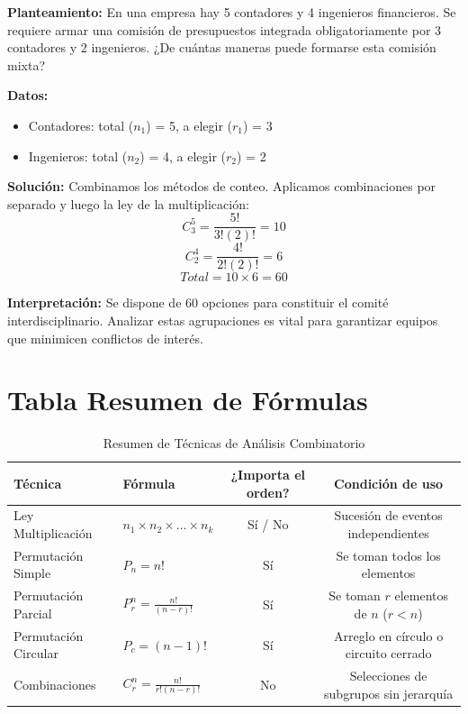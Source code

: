 \documentclass[12pt,letterpaper]{book}
\newcounter{ejemplo}[chapter]
\begin{document}
\begin{ejemplo}
    \textbf{Planteamiento:} En una empresa hay 5 contadores y 4 ingenieros financieros. Se requiere armar una comisión de presupuestos integrada obligatoriamente por 3 contadores y 2 ingenieros. ¿De cuántas maneras puede formarse esta comisión mixta?
    
    \textbf{Datos:}
    \begin{itemize}
        \item Contadores: total ($n_1$) = 5, a elegir ($r_1$) = 3
        \item Ingenieros: total ($n_2$) = 4, a elegir ($r_2$) = 2
    \end{itemize}
    
    \textbf{Solución:}
    Combinamos los métodos de conteo. Aplicamos combinaciones por separado y luego la ley de la multiplicación:
    \[ C_{3}^{5} = \frac{5!}{3!(2)!} = 10 \]
    \[ C_{2}^{4} = \frac{4!}{2!(2)!} = 6 \]
    \[ Total = 10 \times 6 = 60 \]
    
    \textbf{Interpretación:} Se dispone de 60 opciones para constituir el comité interdisciplinario. Analizar estas agrupaciones es vital para garantizar equipos que minimicen conflictos de interés.
\end{ejemplo}


\section{Tabla Resumen de Fórmulas}

\begin{table}[h!]
\centering
\caption{Resumen de Técnicas de Análisis Combinatorio}
\begin{tabular}{@{}llcc@{}}
\toprule
\textbf{Técnica} & \textbf{Fórmula} & \textbf{¿Importa el orden?} & \textbf{Condición de uso} \\ \midrule
Ley Multiplicación & $n_1 \times n_2 \times \dots \times n_k$ & Sí / No & Sucesión de eventos independientes \\
Permutación Simple & $P_{n} = n!$ & Sí & Se toman todos los elementos \\
Permutación Parcial & $P_{r}^{n} = \frac{n!}{(n-r)!}$ & Sí & Se toman $r$ elementos de $n$ ($r < n$) \\
Permutación Circular & $P_c = (n-1)!$ & Sí & Arreglo en círculo o circuito cerrado \\
Combinaciones & $C_{r}^{n} = \frac{n!}{r!(n-r)!}$ & No & Selecciones de subgrupos sin jerarquía \\
\bottomrule
\end{tabular}
\end{table}
\end{document}
